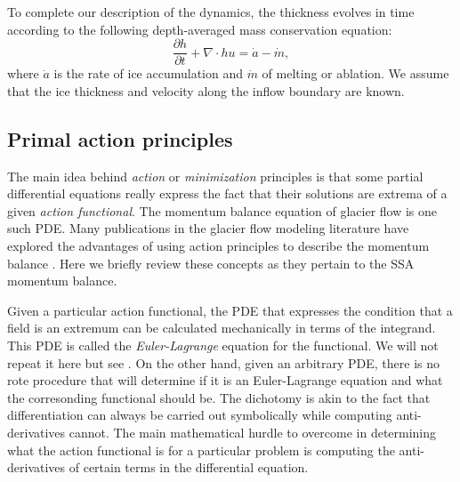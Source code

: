 \documentclass[review,oneside]{igs}
\begin{document}
To complete our description of the dynamics, the thickness evolves in time according to the following depth-averaged mass conservation equation:
\begin{equation}
    \frac{\partial h}{\partial t} + \nabla \cdot hu = \dot a - \dot m,
    \label{eq:conservation-mass}
\end{equation}
where $\dot a$ is the rate of ice accumulation and $\dot m$ of melting or ablation.
We assume that the ice thickness and velocity along the inflow boundary are known.


\subsection{Primal action principles}
\label{sec:primal-action-principles}

The main idea behind \emph{action} or \emph{minimization} principles is that some partial differential equations really express the fact that their solutions are extrema of a given \emph{action functional}.
The momentum balance equation of glacier flow is one such PDE.
Many publications in the glacier flow modeling literature have explored the advantages of using action principles to describe the momentum balance \citep{bassis2010hamilton, dukowicz2010consistent, brinkerhoff2013data, shapero2021icepack}.
Here we briefly review these concepts as they pertain to the SSA momentum balance.

Given a particular action functional, the PDE that expresses the condition that a field is an extremum can be calculated mechanically in terms of the integrand.
This PDE is called the \emph{Euler-Lagrange} equation for the functional.
We will not repeat it here but see \citet{weinstock1974calculus}.
On the other hand, given an arbitrary PDE, there is no rote procedure that will determine if it is an Euler-Lagrange equation and what the corresonding functional should be.
The dichotomy is akin to the fact that differentiation can always be carried out symbolically while computing anti-derivatives cannot.
The main mathematical hurdle to overcome in determining what the action functional is for a particular problem is computing the anti-derivatives of certain terms in the differential equation.
\end{document}
